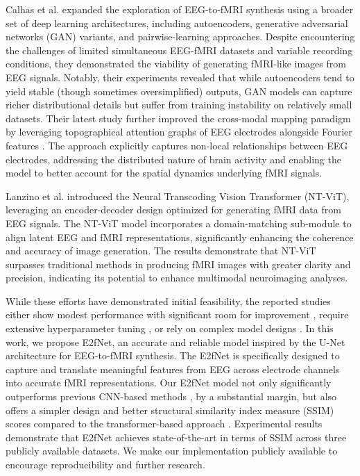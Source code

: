 Calhas et al. \cite{calhas2020eeg} expanded the exploration of EEG-to-fMRI synthesis using a broader set of deep learning architectures, including autoencoders, generative adversarial networks (GAN) \cite{goodfellow2014generative} variants, and pairwise-learning approaches. 
Despite encountering the challenges of limited simultaneous EEG-fMRI datasets and variable recording conditions, they demonstrated the viability of generating fMRI-like images from EEG signals. 
Notably, their experiments revealed that while autoencoders tend to yield stable (though sometimes oversimplified) outputs, GAN models can capture richer distributional details but suffer from training instability on relatively small datasets. 
Their latest study further improved the cross-modal mapping paradigm by leveraging topographical attention graphs of EEG electrodes alongside Fourier features \cite{calhas2022eeg}. 
The approach explicitly captures non-local relationships between EEG electrodes, addressing the distributed nature of brain activity and enabling the model to better account for the spatial dynamics underlying fMRI signals. 

Lanzino et al. \cite{lanzino2024nt} introduced the Neural Transcoding Vision Transformer (NT-ViT), leveraging an encoder-decoder design optimized for generating fMRI data from EEG signals. 
The NT-ViT model incorporates a domain-matching sub-module to align latent EEG and fMRI representations, significantly enhancing the coherence and accuracy of image generation. 
The results demonstrate that NT-ViT surpasses traditional methods in producing fMRI images with greater clarity and precision, indicating its potential to enhance multimodal neuroimaging analyses. 

While these efforts have demonstrated initial feasibility, the reported studies either show modest performance with significant room for improvement \cite{liu2019convolutional,calhas2020eeg,calhas2022eeg}, require extensive hyperparameter tuning \cite{calhas2022eeg}, or rely on complex model designs \cite{lanzino2024nt}. 
In this work, we propose E2fNet, an accurate and reliable model inspired by the U-Net architecture \cite{ronneberger15unet} for EEG-to-fMRI synthesis. 
The E2fNet is specifically designed to capture and translate meaningful features from EEG across electrode channels into accurate fMRI representations. 
Our E2fNet model not only significantly outperforms previous CNN-based methods \cite{liu2019convolutional,calhas2022eeg}, by a substantial margin, but also offers a simpler design and better structural similarity index measure (SSIM) \cite{wang04ssim} scores compared to the transformer-based approach \cite{lanzino2024nt}. 
Experimental results demonstrate that E2fNet achieves state-of-the-art in terms of SSIM across three publicly available datasets. 
We make our implementation publicly available to encourage reproducibility and further research. 